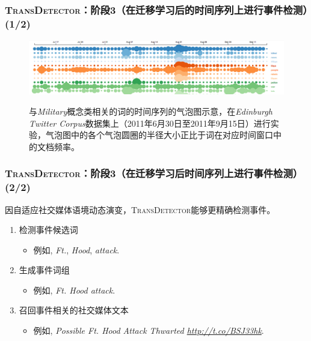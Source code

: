 \begin{frame}
\frametitle{\textsc{TransDetector}：阶段3（在迁移学习后的时间序列上进行事件检测）(1/2)}	
\begin{figure}[h]
		\setlength{\abovecaptionskip}{0.cm}
        \setlength{\belowcaptionskip}{0.cm}
        \centering
        \caption{与\textit{Military}概念类相关的词的时间序列的气泡图示意，在\textit{Edinburgh Twitter Corpus}数据集上（2011年6月30日至2011年9月15日）进行实验，气泡图中的各个气泡圆圈的半径大小正比于词在对应时间窗口中的文档频率。}
        \includegraphics[width=.99\columnwidth]{img/screenShot.png}
        \label{fig:hood}
\end{figure}
\end{frame}

\begin{frame}
\frametitle{\textsc{TransDetector}：阶段3（在迁移学习后时间序列上进行事件检测） (2/2)}
因自适应社交媒体语境动态演变，\textsc{TransDetector}能够更精确检测事件。
\begin{enumerate}
	\item 检测事件候选词
	\begin{itemize}
		\item 例如, \textit{Ft.}, \textit{Hood}, \textit{attack}.
	\end{itemize}
	\item 生成事件词组
	\begin{itemize}
		\item 例如, \textit{Ft. Hood attack}.
	\end{itemize}
	\item 召回事件相关的社交媒体文本
	\begin{itemize}
		\item 例如, \textit{Possible Ft. Hood Attack Thwarted \url{http://t.co/BSJ33hk}}.
	\end{itemize}
\end{enumerate}
\end{frame}


